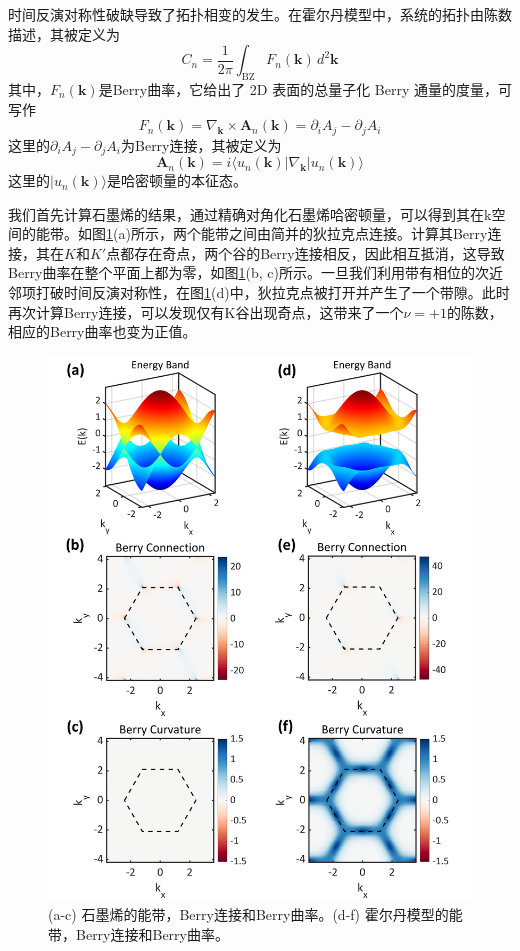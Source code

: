 时间反演对称性破缺导致了拓扑相变的发生。在霍尔丹模型中，系统的拓扑由陈数描述，其被定义为
\begin{equation}
    C_n = \frac{1}{2\pi} \int_{\text{BZ}} F_{n}(\mathbf{k}) \, d^2\mathbf{k}
\end{equation}
其中，$F_{n}(\mathbf{k})$是Berry曲率，它给出了 2D 表面的总量子化 Berry 通量的度量，可写作
\begin{equation}
    F_{n}(\mathbf{k}) = \nabla_{\mathbf{k}} \times \mathbf{A}_{n}(\mathbf{k})=\partial_{i} A_{j} - \partial_{j} A_{i}
\end{equation}
这里的$\partial_{i} A_{j} - \partial_{j} A_{i}$为Berry连接，其被定义为
\begin{equation}
    \mathbf{A}_{n}(\mathbf{k}) = i \langle u_{n}(\mathbf{k}) | \nabla_{\mathbf{k}} | u_{n}(\mathbf{k}) \rangle
\end{equation}
这里的$| u_{n}(\mathbf{k}) \rangle$是哈密顿量的本征态。

我们首先计算石墨烯的结果，通过精确对角化石墨烯哈密顿量，可以得到其在k空间的能带。如图\ref{fig:HaldaneBand}(a)所示，两个能带之间由简并的狄拉克点连接。计算其Berry连接，其在$K$和$K'$点都存在奇点，两个谷的Berry连接相反，因此相互抵消，这导致Berry曲率在整个平面上都为零，如图\ref{fig:HaldaneBand}(b, c)所示。一旦我们利用带有相位的次近邻项打破时间反演对称性，在图\ref{fig:HaldaneBand}(d)中，狄拉克点被打开并产生了一个带隙。此时再次计算Berry连接，可以发现仅有K谷出现奇点，这带来了一个$\nu=+1$的陈数，相应的Berry曲率也变为正值。

\begin{figure}
    \centering
    \includegraphics[width=0.65\linewidth]{figure/Introduction/HaldaneBand.png}
    \caption{(a-c) 石墨烯的能带，Berry连接和Berry曲率。(d-f) 霍尔丹模型的能带，Berry连接和Berry曲率。}
    \label{fig:HaldaneBand}
\end{figure}

